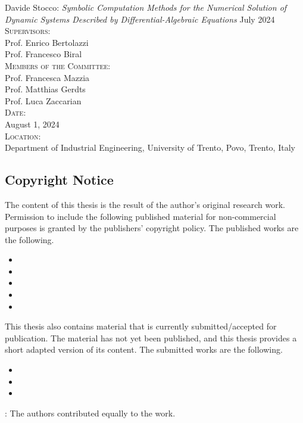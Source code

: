 \documentclass[a5paper, 9pt, openright]{extbook} %
\date{January 2024}
\makeatletter
\newcommand*{\emptystyles}{%
\let\oldplain\ps@plain
\let\ps@plain\ps@empty
\pagestyle{empty}}
\let\ps@plain\ps@empty%
\makeatother
\begin{document}
\emptystyles

\hbox{}

\doclicenseThis{}
\vspace*{\fill}
Davide Stocco: \emph{Symbolic Computation Methods for the Numerical Solution of Dynamic Systems Described by Differential-Algebraic Equations} \textcopyright{} July 2024 \\[1.0em]
\textsc{Supervisors:} \\
Prof. Enrico Bertolazzi \\
Prof. Francesco Biral \\[1.0em]
\textsc{Members of the Committee:} \\
Prof. Francesca Mazzia \\
Prof. Matthias Gerdts \\
Prof. Luca Zaccarian \\[1.0em]
\textsc{Date:} \\
August 1, 2024 \\[1.0em]
\textsc{Location:} \\
Department of Industrial Engineering, University of Trento, Povo, Trento, Italy
\thispagestyle{empty}
\newpage

\subsection*{Copyright Notice}

The content of this thesis is the result of the author's original research work. Permission to include the following published material for non-commercial purposes is granted by the publishers' copyright policy. The published works are the following.
%
\begin{itemize}
  \setlength{\itemsep}{0.0em}
  \item {}
  \item {}
  \item {}
  \item {}
  \item {}
\end{itemize}

This thesis also contains material that is currently submitted/accepted for publication. The material has not yet been published, and this thesis provides a short adapted version of its content. The submitted works are the following.
%
\begin{itemize}
  \setlength{\itemsep}{0.0em}
  \item {}
  \item {}
  \item {}
\end{itemize}
%
\dag{}: The authors contributed equally to the work.
\end{document}
